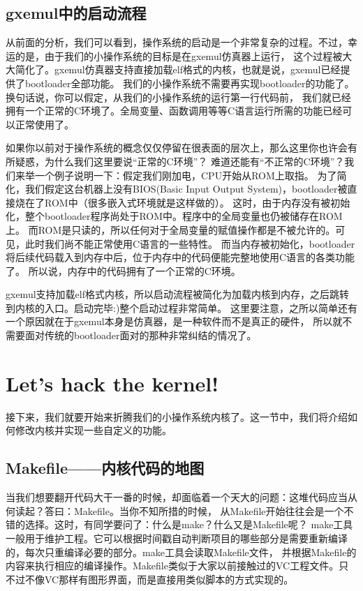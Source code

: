 \subsection{gxemul中的启动流程}
从前面的分析，我们可以看到，操作系统的启动是一个非常复杂的过程。不过，幸运的是，由于我们的小操作系统的目标是在gxemul仿真器上运行，
这个过程被大大简化了。gxemul仿真器支持直接加载elf格式的内核，也就是说，gxemul已经提供了bootloader全部功能。
我们的小操作系统不需要再实现bootloader的功能了。换句话说，你可以假定，从我们的小操作系统的运行第一行代码前，
我们就已经拥有一个正常的C环境了。全局变量、函数调用等等C语言运行所需的功能已经可以正常使用了。

\begin{note}
如果你以前对于操作系统的概念仅仅停留在很表面的层次上，那么这里你也许会有所疑惑，为什么我们这里要说“正常的C环境”？
难道还能有“不正常的C环境”？我们来举一个例子说明一下：假定我们刚加电，CPU开始从ROM上取指。
为了简化，我们假定这台机器上没有BIOS(Basic Input Output System)，bootloader被直接烧在了ROM中（很多嵌入式环境就是这样做的）。
这时，由于内存没有被初始化，整个bootloader程序尚处于ROM中。程序中的全局变量也仍被储存在ROM上。
而ROM是只读的，所以任何对于全局变量的赋值操作都是不被允许的。可见，此时我们尚不能正常使用C语言的一些特性。
而当内存被初始化，bootloader将后续代码载入到内存中后，位于内存中的代码便能完整地使用C语言的各类功能了。
所以说，内存中的代码拥有了一个正常的C环境。
\end{note}

gxemul支持加载elf格式内核，所以启动流程被简化为加载内核到内存，之后跳转到内核的入口。启动完毕:)整个启动过程非常简单。
这里要注意，之所以简单还有一个原因就在于gxemul本身是仿真器，是一种软件而不是真正的硬件，
所以就不需要面对传统的bootloader面对的那种非常纠结的情况了。

\section{Let's hack the kernel!}

接下来，我们就要开始来折腾我们的小操作系统内核了。这一节中，我们将介绍如何修改内核并实现一些自定义的功能。

\subsection{Makefile——内核代码的地图}
当我们想要翻开代码大干一番的时候，却面临着一个天大的问题：这堆代码应当从何读起？答曰：Makefile。当你不知所措的时候，
从Makefile开始往往会是一个不错的选择。这时，有同学要问了：什么是make？什么又是Makefile呢？
make工具一般用于维护工程。它可以根据时间戳自动判断项目的哪些部分是需要重新编译的，每次只重编译必要的部分。make工具会读取Makefile文件，
并根据Makefile的内容来执行相应的编译操作。Makefile类似于大家以前接触过的VC工程文件。只不过不像VC那样有图形界面，而是直接用类似脚本的方式实现的。


